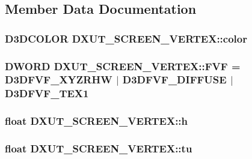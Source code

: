 \subsection{Member Data Documentation}
\hypertarget{struct_d_x_u_t___s_c_r_e_e_n___v_e_r_t_e_x_a4a1e6ac32a7e752e8ce6f60cad1469f6}{
\subsubsection[{color}]{\setlength{\rightskip}{0pt plus 5cm}D3DCOLOR {\bf DXUT\_\-SCREEN\_\-VERTEX::color}}}
\label{struct_d_x_u_t___s_c_r_e_e_n___v_e_r_t_e_x_a4a1e6ac32a7e752e8ce6f60cad1469f6}
\hypertarget{struct_d_x_u_t___s_c_r_e_e_n___v_e_r_t_e_x_a780008d5b7035a09a3422e0407c701a7}{
\subsubsection[{FVF}]{\setlength{\rightskip}{0pt plus 5cm}DWORD {\bf DXUT\_\-SCREEN\_\-VERTEX::FVF} = D3DFVF\_\-XYZRHW $|$ D3DFVF\_\-DIFFUSE $|$ D3DFVF\_\-TEX1}}
\label{struct_d_x_u_t___s_c_r_e_e_n___v_e_r_t_e_x_a780008d5b7035a09a3422e0407c701a7}
\hypertarget{struct_d_x_u_t___s_c_r_e_e_n___v_e_r_t_e_x_a07f8215a46cdcfb9cd7a6e5d205dd794}{
\subsubsection[{h}]{\setlength{\rightskip}{0pt plus 5cm}float {\bf DXUT\_\-SCREEN\_\-VERTEX::h}}}
\label{struct_d_x_u_t___s_c_r_e_e_n___v_e_r_t_e_x_a07f8215a46cdcfb9cd7a6e5d205dd794}
\hypertarget{struct_d_x_u_t___s_c_r_e_e_n___v_e_r_t_e_x_a3598a58452fda2c5ae7fac091c3ef64e}{
\subsubsection[{tu}]{\setlength{\rightskip}{0pt plus 5cm}float {\bf DXUT\_\-SCREEN\_\-VERTEX::tu}}}
\label{struct_d_x_u_t___s_c_r_e_e_n___v_e_r_t_e_x_a3598a58452fda2c5ae7fac091c3ef64e}
